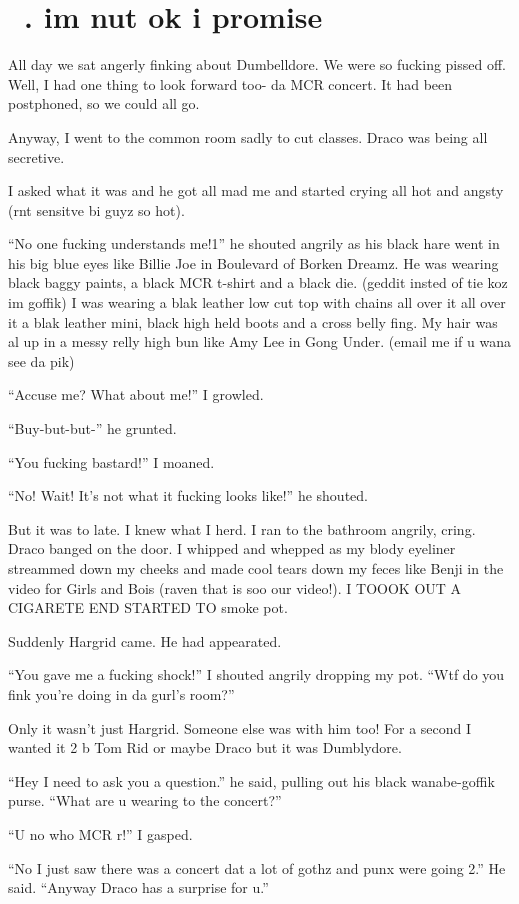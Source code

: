 \section{\chaptername~\thesection. im nut ok i promise}


\XXX{\Xfill 666\Xfill}

All day we sat angerly finking about Dumbelldore. We were so fucking pissed off. Well, I had one thing to look forward too- da MCR concert. It had been postphoned, so we could all go.

Anyway, I went to the common room sadly to cut classes. Draco was being all secretive.

I asked what it was and he got all mad me and started crying all hot and angsty (rnt sensitve bi guyz so hot).

\enquote{No one fucking understands me!1} he shouted angrily as his black hare went in his big blue eyes like Billie Joe in Boulevard of Borken Dreamz. He was wearing black baggy paints, a black MCR t-shirt and a black die. (geddit insted of tie koz im goffik) I was wearing a blak leather low cut top with chains all over it all over it a blak leather mini, black high held boots and a cross belly fing. My hair was al up in a messy relly high bun like Amy Lee in Gong Under. (email me if u wana see da pik)

\enquote{Accuse me? What about me!} I growled.

\enquote{Buy-but-but-} he grunted.

\enquote{You fucking bastard!} I moaned.

\enquote{No! Wait! It's not what it fucking looks like!} he shouted.

But it was to late. I knew what I herd. I ran to the bathroom angrily, cring. Draco banged on the door. I whipped and whepped as my blody eyeliner streammed down my cheeks and made cool tears down my feces like Benji in the video for Girls and Bois (raven that is soo our video!). I TOOOK OUT A CIGARETE END STARTED TO smoke pot.

Suddenly Hargrid came. He had appearated.

\enquote{You gave me a fucking shock!} I shouted angrily dropping my pot. \enquote{Wtf do you fink you're doing in da gurl's room?}

Only it wasn't just Hargrid. Someone else was with him too! For a second I wanted it 2 b Tom Rid or maybe Draco but it was Dumblydore.

\enquote{Hey I need to ask you a question.} he said, pulling out his black wanabe-goffik purse. \enquote{What are u wearing to the concert?}

\enquote{U no who MCR r!} I gasped.

\enquote{No I just saw there was a concert dat a lot of gothz and punx were going 2.} He said. \enquote{Anyway Draco has a surprise for u.}

